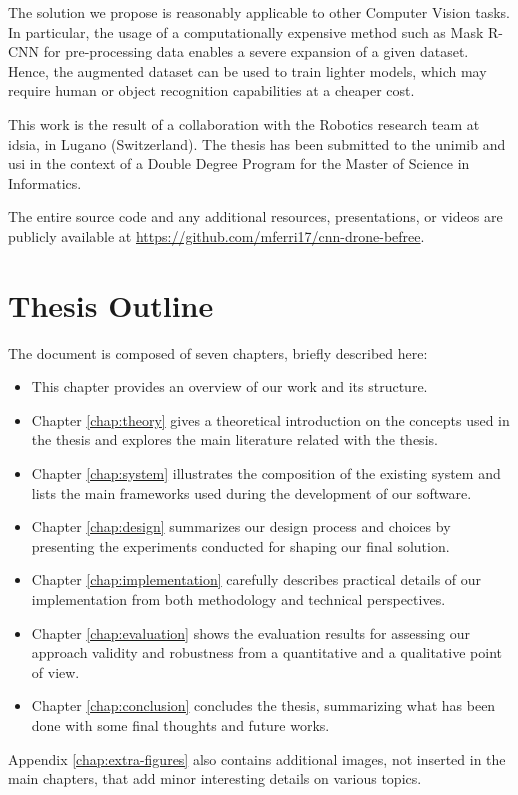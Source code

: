 \medskip

The solution we propose is reasonably applicable to other Computer Vision tasks. In particular, the usage of a computationally expensive method such as Mask R-CNN for pre-processing data enables a severe expansion of a given dataset. Hence, the augmented dataset can be used to train lighter models, which may require human or object recognition capabilities at a cheaper cost.

\clearpage

This work is the result of a collaboration with the Robotics research team at \gls{idsia}, in Lugano (Switzerland). The thesis has been submitted to the \gls{unimib} and \gls{usi} in the context of a Double Degree Program for the Master of Science in Informatics.

The entire source code and any additional resources, presentations, or videos are publicly available at \url{https://github.com/mferri17/cnn-drone-befree}.




\section*{Thesis Outline}
\label{sec:outline}

The document is composed of seven chapters, briefly described here:

\begin{itemize}
	\item This chapter provides an overview of our work and its structure.
	\item Chapter \ref{chap:theory} gives a theoretical introduction on the concepts used in the thesis and explores the main literature related with the thesis.
	\item Chapter \ref{chap:system} illustrates the composition of the existing system and lists the main frameworks used during the development of our software.
	\item Chapter \ref{chap:design} summarizes our design process and choices by presenting the experiments conducted for shaping our final solution.
	\item Chapter \ref{chap:implementation} carefully describes practical details of our implementation from both methodology and technical perspectives.
	\item Chapter \ref{chap:evaluation} shows the evaluation results for assessing our approach validity and robustness from a quantitative and a qualitative point of view.
	\item Chapter \ref{chap:conclusion} concludes the thesis, summarizing what has been done with some final thoughts and future works.
\end{itemize}

Appendix \ref{chap:extra-figures} also contains additional images, not inserted in the main chapters, that add minor interesting details on various topics.





